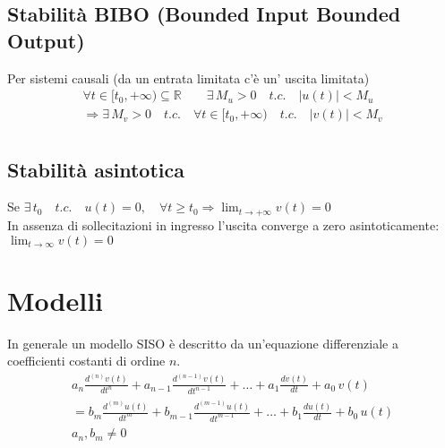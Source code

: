 \subsection{Stabilità BIBO (Bounded Input Bounded Output)}\label{sist_prop_BIBOstab}
	
	Per sistemi causali (da un entrata limitata c'è un' uscita limitata)
	\[
	\begin{split}
		\forall t \in [t_0, + \infty) \subseteq \mathbb{R} \qquad \exists \, M_u >0 \quad t.c. \quad \lvert u(t) \rvert < M_u \\
		\Rightarrow \exists \, M_v > 0 \quad t.c. \quad \forall t \in [t_0, + \infty) \quad t.c. \quad \lvert v(t) \rvert < M_v\\
	\end{split}		
	\]
	
\subsection{Stabilità asintotica}
	Se $\exists \, t_0 \quad t.c. \quad u(t)=0, \quad \forall t \ge t_0 \Rightarrow \lim_{t \to +\infty} v(t)=0$\\
	In assenza di sollecitazioni in ingresso l'uscita converge a zero asintoticamente: $\lim_{t \to \infty} v(t)=0$
	


	
\section{Modelli}

In generale un modello SISO è descritto da un'equazione differenziale a coefficienti costanti di ordine $n$.
\begin{equation}
\begin{split}
	a_n \frac{d^{(n)} v(t)}{dt^n} 
		+ a_{n-1} \frac{d^{(n-1)} v(t)}{dt^{n-1}} 
		+ \dots 
		+ a_1 \frac{dv(t)}{dt} 
		+ a_0\,v(t)\\
	= b_m \frac{d^{(m)} u(t)}{dt^m}
		+ b_{m-1} \frac{d^{(m-1)} u(t)}{dt^{m-1}} 
		+ \dots
		+ b_1 \frac{du(t)}{dt} 
		+ b_0\,u(t)\\
	a_n, b_m \ne 0	
\end{split}
\tag{2}\label{equation 2}
\end{equation}

